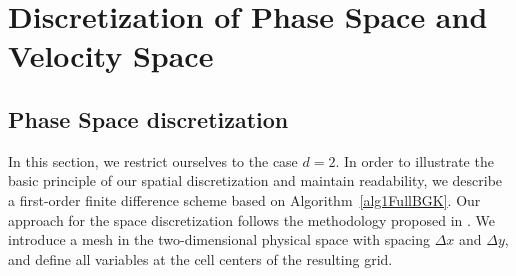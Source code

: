 \documentclass[final,11pt]{siamart251216}
\numberwithin{equation}{section}
\theoremstyle{definition}
\theoremstyle{remark}
\begin{document}
\section{Discretization of Phase Space and Velocity Space}
\label{sec3b}
\subsection{Phase Space discretization}
In this section, we restrict ourselves to the case $d = 2$. In order to illustrate the basic principle of our spatial discretization and maintain readability, we describe a first-order finite difference scheme based on Algorithm~\ref{alg1FullBGK}. Our approach for the space discretization follows the methodology proposed in \cite{BOSCARINO}.
We introduce a mesh in the two-dimensional physical space with spacing $\Delta x$ and $\Delta y$, and define all variables at the cell centers of the resulting grid. 
\end{document}
